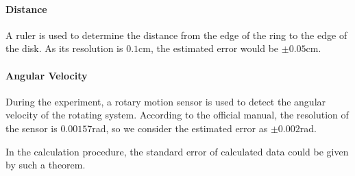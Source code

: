 \paragraph{Distance}
A ruler is used to determine the distance from the edge of the ring to the edge of the disk. As its resolution is $0.1$cm, the estimated error would be $\pm0.05$cm.
\paragraph{Angular Velocity}
During the experiment, a rotary motion sensor is used to detect the angular velocity of the rotating system. According to the official manual, the resolution of the sensor is $0.00157$rad, so we consider the estimated error as $\pm0.002$rad.\par
In the calculation procedure, the standard error of calculated data could be given by such a theorem.
